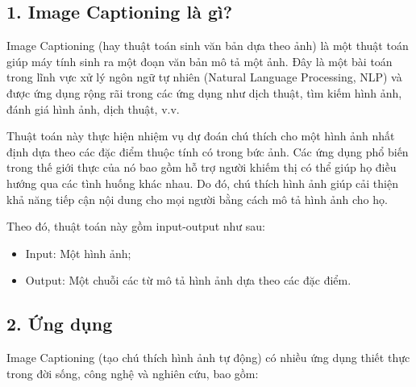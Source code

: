 \documentclass[../main.tex]{subfiles}
\begin{document}
\subsection*{1. Image Captioning là gì?}

Image Captioning (hay thuật toán sinh văn bản dựa theo ảnh) là một thuật toán giúp máy tính sinh ra một đoạn văn bản mô tả một ảnh. Đây là một bài toán trong lĩnh vực xử lý ngôn ngữ tự nhiên (Natural Language Processing, NLP) và được ứng dụng rộng rãi trong các ứng dụng như dịch thuật, tìm kiếm hình ảnh, đánh giá hình ảnh, dịch thuật, v.v.

Thuật toán này thực hiện nhiệm vụ dự đoán chú thích cho một hình ảnh nhất định dựa theo các đặc điểm thuộc tính có trong bức ảnh. Các ứng dụng phổ biến trong thế giới thực của nó bao gồm hỗ trợ người khiếm thị có thể giúp họ điều hướng qua các tình huống khác nhau. Do đó, chú thích hình ảnh giúp cải thiện khả năng tiếp cận nội dung cho mọi người bằng cách mô tả hình ảnh cho họ.

Theo đó, thuật toán này gồm input-output như sau:

\begin{itemize}
    \item Input: Một hình ảnh;
    \item Output: Một chuỗi các từ mô tả hình ảnh dựa theo các đặc điểm.
\end{itemize}

\subsection*{2. Ứng dụng}

Image Captioning (tạo chú thích hình ảnh tự động) có nhiều ứng dụng thiết thực trong đời sống, công nghệ và nghiên cứu, bao gồm:
\end{document}
